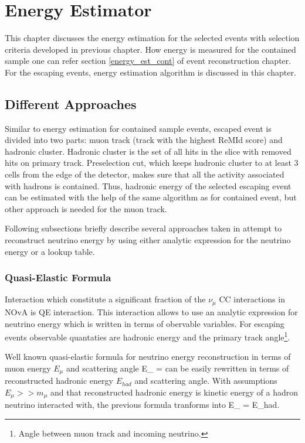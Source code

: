 \chapter{Energy Estimator}
\label{energy_estimator_chapter}

This chapter discusses the energy estimation for the selected events with selection
criteria developed in previous chapter. How energy is measured for the contained 
sample one can refer section \ref{energy_est_cont} of event reconstruction chapter.
For the escaping events, energy estimation algorithm is discussed in this chapter.

\section{Different Approaches}
Similar to energy estimation for contained sample events, escaped event is divided
into two parts: muon track (track with the highest ReMId score) and hadronic cluster.
Hadronic cluster is the set of all hits in the slice with removed hits on primary 
track. Preselection cut, which keeps hudronic cluster to at least 3 cells from
the edge of the detector, makes sure that all the activity associated with hadrons is
contained. Thus, hadronic energy of the selected escaping event can be estimated
with the help of the same algorithm as for contained event, but other approach is needed
for the muon track.

Following subsections briefly describe several approaches taken in attempt to reconstruct
neutrino energy by using either analytic expression for the neutrino energy or a 
lookup table.

\subsection{Quasi-Elastic Formula}
Interaction which constitute a significant fraction of the $\nu_\mu$ CC interactions 
in NOvA is QE interaction. This interaction allows to use an analytic expression for
neutrino energy which is written in terms of obervable variables. For escaping events
observable quantaties are hadronic energy and the primary track angle\footnote{Angle
between muon track and incoming neutrino.}. 

Well known quasi-elastic formula for neutrino energy reconstruction in terms of muon
energy $E_\mu$ and scattering angle %
\be
E_{\nu} = 
\ee
can be easily rewritten in terms of reconstructed hadronic energy $E_{had}$ and 
scattering angle. With assumptions $E_\mu >> m_\mu$ and that reconstructed hadronic 
energy is kinetic energy of a hadron neutrino interacted with, the previous formula 
tranforms into
\be
E_{\nu} = E_{had}.
\ee

